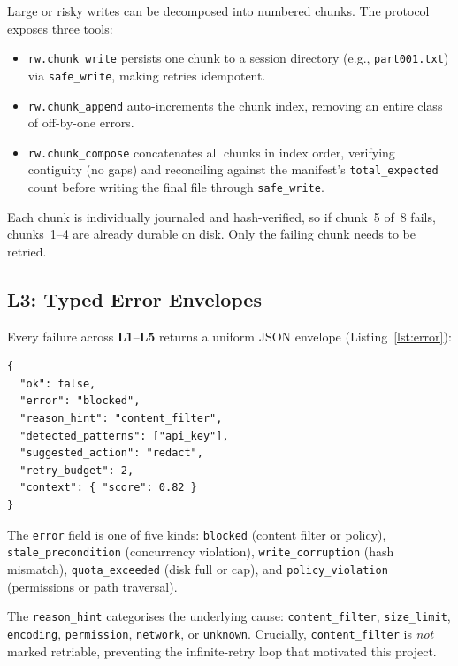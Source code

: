 \documentclass[11pt,twocolumn]{article}
\newcommand{\tool}[1]{\texttt{#1}}
\newcommand{\layer}[1]{\textbf{L#1}}
\begin{document}
Large or risky writes can be decomposed into numbered chunks.  The
protocol exposes three tools:

\begin{itemize}[nosep]
  \item \tool{rw.chunk\_write} persists one chunk to a session
    directory (e.g., \texttt{part\text{-}001.txt}) via
    \tool{safe\_write}, making retries idempotent.
  \item \tool{rw.chunk\_append} auto-increments the chunk index,
    removing an entire class of off-by-one errors.
  \item \tool{rw.chunk\_compose} concatenates all chunks in index
    order, verifying contiguity (no gaps) and reconciling against
    the manifest's \texttt{total\_expected} count before writing
    the final file through \tool{safe\_write}.
\end{itemize}

Each chunk is individually journaled and hash-verified, so if chunk~5
of~8 fails, chunks~1--4 are already durable on disk.  Only the
failing chunk needs to be retried.

\subsection{L3: Typed Error Envelopes}
\label{sec:l3}

Every failure across \layer{1}--\layer{5} returns a uniform JSON
envelope (Listing~\ref{lst:error}):

\begin{lstlisting}[language={},caption={L3 error envelope (abbreviated).},label=lst:error]
{
  "ok": false,
  "error": "blocked",
  "reason_hint": "content_filter",
  "detected_patterns": ["api_key"],
  "suggested_action": "redact",
  "retry_budget": 2,
  "context": { "score": 0.82 }
}
\end{lstlisting}

The \texttt{error} field is one of five kinds:
\texttt{blocked} (content filter or policy),
\texttt{stale\_precondition} (concurrency violation),
\texttt{write\_corruption} (hash mismatch),
\texttt{quota\_exceeded} (disk full or cap), and
\texttt{policy\_violation} (permissions or path traversal).

The \texttt{reason\_hint} categorises the underlying cause:
\texttt{content\_filter}, \texttt{size\_limit},
\texttt{encoding}, \texttt{permission},
\texttt{network}, or \texttt{unknown}.
Crucially, \texttt{content\_filter} is \emph{not} marked
retriable, preventing the infinite-retry loop that motivated
this project.
\end{document}
